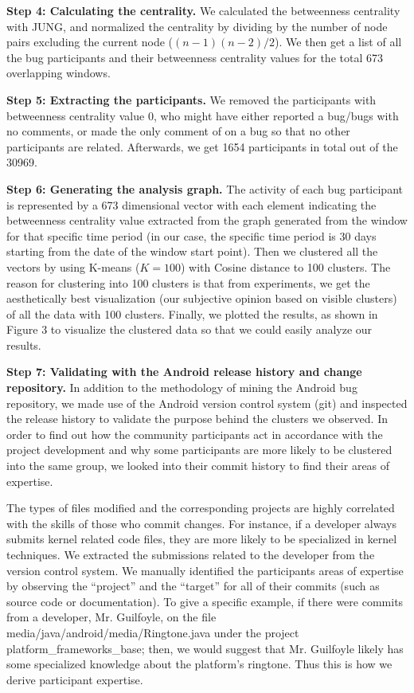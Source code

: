 \documentclass[10pt, conference, compsocconf]{IEEEtran}
\begin{document}
\textbf{Step 4: Calculating the centrality.} We calculated the
betweenness centrality with JUNG, and normalized the centrality by
dividing by the number of node pairs excluding the current node
($(n-1)(n-2)/2$). We then get a list of all the bug participants and
their betweenness centrality values for the total 673 overlapping
windows.


\textbf{Step 5: Extracting the participants.} We removed the
participants with betweenness centrality value 0, who might have
either reported a bug/bugs with no comments, or made the only comment
of on a bug so that no other participants are related. Afterwards, we get
1654 participants in total out of the 30969.


\textbf{Step 6: Generating the analysis graph.} The activity
of each bug participant is represented by a 673 dimensional vector with
each element indicating the betweenness centrality value extracted
from the graph generated from the window for that
specific time period (in our case, the specific time period is 30 days
starting from the date of the window start point). Then we clustered
all the vectors by using K-means ($K=100$) with Cosine distance to 100
clusters. The reason for clustering into 100 clusters is that from
experiments, we get the aesthetically best visualization (our
subjective opinion based on visible clusters) of all the data with 100
clusters. Finally, we plotted the results, as shown in Figure 3 to
visualize the clustered data so that we could easily analyze
our results.


\textbf{Step 7: Validating with the Android release history and change
  repository.} In addition to the methodology of mining the Android
bug repository, we made use of the Android version control system
(git) and
inspected the release history to validate the purpose behind the
clusters we observed.
In order to find out how the community participants
act in accordance with the project development and why some
participants are more likely to be clustered into the same group, we
looked into their commit history to find their areas of expertise.


The types of files modified and the corresponding projects are highly
correlated with the skills of those who commit changes. For
instance, if a developer always submits kernel related code
files, they are more likely to be specialized in kernel techniques. We
extracted the submissions related to the developer from the version
control system.
We manually identified the participants areas of expertise by
observing the ``project'' and the
``target'' for all of their commits (such as source code or
documentation).
To give a specific example, if there were commits from a developer,
Mr. Guilfoyle, on the file
media/java/android/media/Ringtone.java under the project
platform\_frameworks\_base; then, we would suggest that Mr. Guilfoyle 
likely has some specialized knowledge about the platform's ringtone. 
Thus this is how we derive participant expertise.
\end{document}
